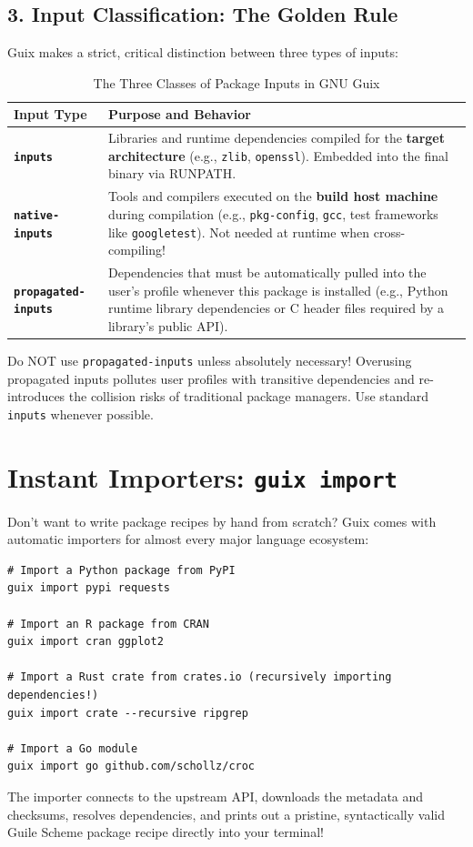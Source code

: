\subsection{3. Input Classification: The Golden Rule}

Guix makes a strict, critical distinction between three types of inputs:

\begin{table}[htbp]
\centering
\small
\begin{tabularx}{\textwidth}{L{0.28\textwidth} Y}
\toprule
\textbf{Input Type} & \textbf{Purpose and Behavior} \\
\midrule
\textbf{\texttt{inputs}} & Libraries and runtime dependencies compiled for the \textbf{target architecture} (e.g., \texttt{zlib}, \texttt{openssl}). Embedded into the final binary via RUNPATH. \\
\addlinespace
\textbf{\texttt{native-inputs}} & Tools and compilers executed on the \textbf{build host machine} during compilation (e.g., \texttt{pkg-config}, \texttt{gcc}, test frameworks like \texttt{googletest}). Not needed at runtime when cross-compiling! \\
\addlinespace
\textbf{\texttt{propagated-inputs}} & Dependencies that must be automatically pulled into the user's profile whenever this package is installed (e.g., Python runtime library dependencies or C header files required by a library's public API). \\
\bottomrule
\end{tabularx}
\caption{The Three Classes of Package Inputs in GNU Guix}
\end{table}

\begin{footgunbox}
Do NOT use \texttt{propagated-inputs} unless absolutely necessary! Overusing propagated inputs pollutes user profiles with transitive dependencies and re-introduces the collision risks of traditional package managers. Use standard \texttt{inputs} whenever possible.
\end{footgunbox}

\section{Instant Importers: \texttt{guix import}}

Don't want to write package recipes by hand from scratch? Guix comes with automatic importers for almost every major language ecosystem:

\begin{lstlisting}[style=guixcli]
# Import a Python package from PyPI
guix import pypi requests

# Import an R package from CRAN
guix import cran ggplot2

# Import a Rust crate from crates.io (recursively importing dependencies!)
guix import crate --recursive ripgrep

# Import a Go module
guix import go github.com/schollz/croc
\end{lstlisting}

The importer connects to the upstream API, downloads the metadata and checksums, resolves dependencies, and prints out a pristine, syntactically valid Guile Scheme package recipe directly into your terminal!
